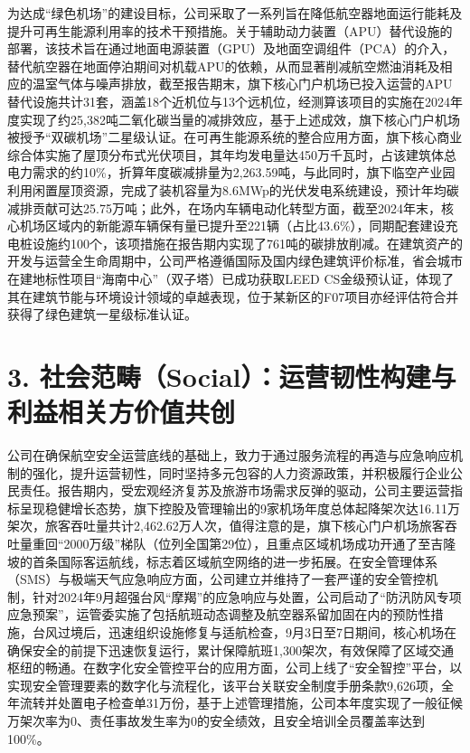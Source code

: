 \documentclass[a4paper,12pt]{article}
\begin{document}
为达成“绿色机场”的建设目标，公司采取了一系列旨在降低航空器地面运行能耗及提升可再生能源利用率的技术干预措施。关于辅助动力装置（APU）替代设施的部署，该技术旨在通过地面电源装置（GPU）及地面空调组件（PCA）的介入，替代航空器在地面停泊期间对机载APU的依赖，从而显著削减航空燃油消耗及相应的温室气体与噪声排放，截至报告期末，旗下核心门户机场已投入运营的APU替代设施共计31套，涵盖18个近机位与13个远机位，经测算该项目的实施在2024年度实现了约25,382吨二氧化碳当量的减排效应，基于上述成效，旗下核心门户机场被授予“双碳机场”二星级认证。在可再生能源系统的整合应用方面，旗下核心商业综合体实施了屋顶分布式光伏项目，其年均发电量达450万千瓦时，占该建筑体总电力需求的约10\%，折算年度碳减排量为2,263.59吨，与此同时，旗下临空产业园利用闲置屋顶资源，完成了装机容量为8.6MWp的光伏发电系统建设，预计年均碳减排贡献可达25.75万吨；此外，在场内车辆电动化转型方面，截至2024年末，核心机场区域内的新能源车辆保有量已提升至221辆（占比43.6\%），同期配套建设充电桩设施约100个，该项措施在报告期内实现了761吨的碳排放削减。在建筑资产的开发与运营全生命周期中，公司严格遵循国际及国内绿色建筑评价标准，省会城市在建地标性项目“海南中心”（双子塔）已成功获取LEED CS金级预认证，体现了其在建筑节能与环境设计领域的卓越表现，位于某新区的F07项目亦经评估符合并获得了绿色建筑一星级标准认证。

\section{3. 社会范畴（Social）：运营韧性构建与利益相关方价值共创}

公司在确保航空安全运营底线的基础上，致力于通过服务流程的再造与应急响应机制的强化，提升运营韧性，同时坚持多元包容的人力资源政策，并积极履行企业公民责任。报告期内，受宏观经济复苏及旅游市场需求反弹的驱动，公司主要运营指标呈现稳健增长态势，旗下控股及管理输出的9家机场年度总体起降架次达16.11万架次，旅客吞吐量共计2,462.62万人次，值得注意的是，旗下核心门户机场旅客吞吐量重回“2000万级”梯队（位列全国第29位），且重点区域机场成功开通了至吉隆坡的首条国际客运航线，标志着区域航空网络的进一步拓展。在安全管理体系（SMS）与极端天气应急响应方面，公司建立并维持了一套严谨的安全管控机制，针对2024年9月超强台风“摩羯”的应急响应与处置，公司启动了“防汛防风专项应急预案”，运管委实施了包括航班动态调整及航空器系留加固在内的预防性措施，台风过境后，迅速组织设施修复与适航检查，9月3日至7日期间，核心机场在确保安全的前提下迅速恢复运行，累计保障航班1,300架次，有效保障了区域交通枢纽的畅通。在数字化安全管控平台的应用方面，公司上线了“安全智控”平台，以实现安全管理要素的数字化与流程化，该平台关联安全制度手册条款9,626项，全年流转并处置电子检查单31万份，基于上述管理措施，公司本年度实现了一般征候万架次率为0、责任事故发生率为0的安全绩效，且安全培训全员覆盖率达到100\%。
\end{document}

